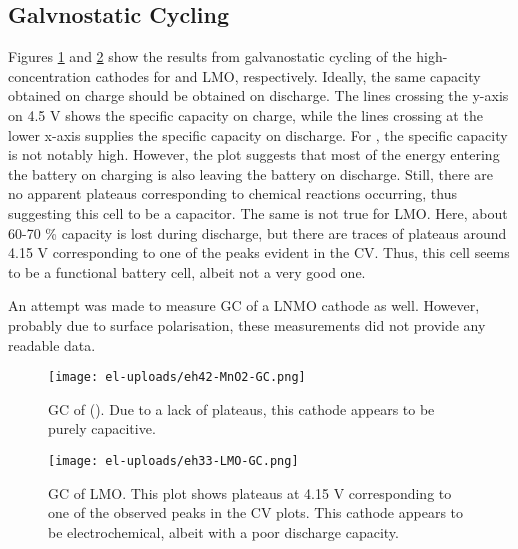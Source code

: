 \documentclass[Main/main.tex]{subfiles}
\begin{document}
\subsection{Galvnostatic Cycling}
Figures \ref{fig:GC_Mn} and \ref{fig:GC_LMO} show the results from galvanostatic cycling of the high-concentration cathodes for  and LMO, respectively. Ideally, the same capacity obtained on charge should be obtained on discharge. The lines crossing the y-axis on 4.5 V shows the specific capacity on charge, while the lines crossing at the lower x-axis supplies the specific capacity on discharge. For , the specific capacity is not notably high. However, the plot suggests that most of the energy entering the battery on charging is also leaving the battery on discharge. Still, there are no apparent plateaus corresponding to chemical reactions occurring, thus suggesting this cell to be a capacitor.
The same is not true for LMO. Here, about 60-70 \% capacity is lost during discharge, but there are traces of plateaus around 4.15 V corresponding to one of the peaks evident in the CV. Thus, this cell seems to be a functional battery cell, albeit not a very good one. 

An attempt was made to measure GC of a LNMO cathode as well. However, probably due to surface polarisation, these measurements did not provide any readable data.

\begin{figure}[ht]
    \centering
    \texttt{[image: el-uploads/eh42-MnO2-GC.png]}
    \caption{GC of (). Due to a lack of plateaus, this cathode appears to be purely capacitive.}
    \label{fig:GC_Mn}
\end{figure}

\begin{figure}[ht]
    \centering
    \texttt{[image: el-uploads/eh33-LMO-GC.png]}
    \caption{GC of LMO. This plot shows plateaus at 4.15 V corresponding to one of the observed peaks in the CV plots. This cathode appears to be electrochemical, albeit with a poor discharge capacity.}
    \label{fig:GC_LMO}
\end{figure}
\end{document}
